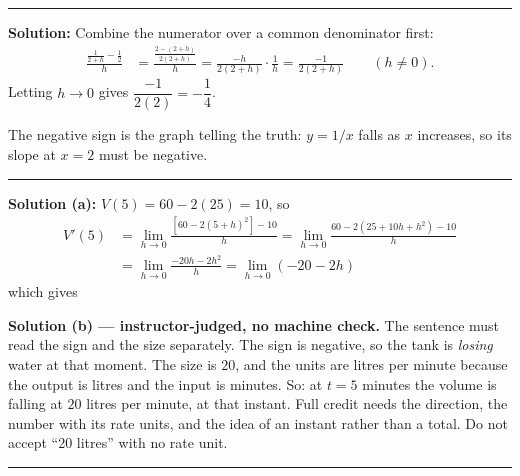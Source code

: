 \documentclass[12pt]{article}
\begin{document}
\vspace{0.2cm}\noindent\rule{\linewidth}{0.2pt}\vspace{0.2cm}


\textbf{Solution:} Combine the numerator over a common denominator first:
\begin{align*}
  \frac{\frac{1}{2+h} - \frac{1}{2}}{h}
    &= \frac{\frac{2 - (2+h)}{2(2+h)}}{h}
     = \frac{-h}{2(2+h)} \cdot \frac{1}{h}
     = \frac{-1}{2(2+h)} \qquad (h \neq 0).
\end{align*}
Letting $h \to 0$ gives $\dfrac{-1}{2(2)} = -\dfrac{1}{4}$. 

The negative sign is the graph telling the truth: $y = 1/x$ falls as $x$
increases, so its slope at $x = 2$ must be negative.

\vspace{0.2cm}\noindent\rule{\linewidth}{0.2pt}\vspace{0.2cm}


\textbf{Solution (a):} $V(5) = 60 - 2(25) = 10$, so
\begin{align*}
  V'(5) &= \lim_{h \to 0} \frac{\left[60 - 2(5+h)^2\right] - 10}{h}
         = \lim_{h \to 0} \frac{60 - 2\left(25 + 10h + h^2\right) - 10}{h} \\[2pt]
        &= \lim_{h \to 0} \frac{-20h - 2h^2}{h}
         = \lim_{h \to 0} (-20 - 2h)
\end{align*}
which gives 

\textbf{Solution (b) --- instructor-judged, no machine check.} The sentence must
read the sign and the size separately. The sign is negative, so the tank is
\emph{losing} water at that moment. The size is $20$, and the units are litres
per minute because the output is litres and the input is minutes. So: at
$t = 5$ minutes the volume is falling at $20$ litres per minute, at that instant.
Full credit needs the direction, the number with its rate units, and the idea of
an instant rather than a total. Do not accept ``20 litres'' with no rate unit.

\vspace{0.2cm}\noindent\rule{\linewidth}{0.2pt}\vspace{0.2cm}

\end{document}
